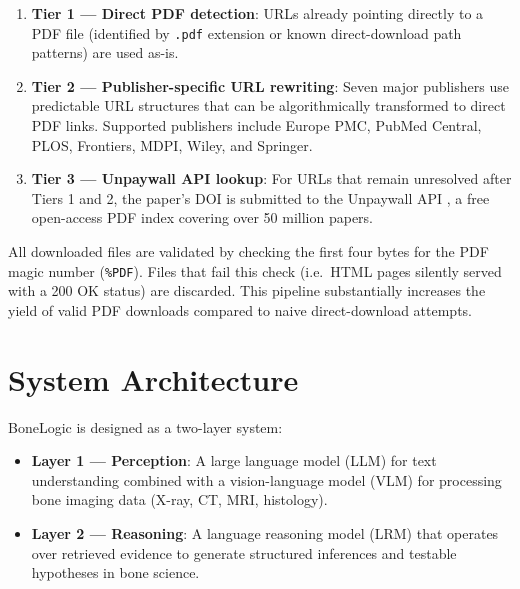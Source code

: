 \documentclass[12pt, a4paper]{article}
\begin{document}
\begin{enumerate}
    \item \textbf{Tier 1 --- Direct PDF detection}: URLs already pointing directly
          to a PDF file (identified by \texttt{.pdf} extension or known
          direct-download path patterns) are used as-is.
    \item \textbf{Tier 2 --- Publisher-specific URL rewriting}: Seven major
          publishers use predictable URL structures that can be algorithmically
          transformed to direct PDF links. Supported publishers include
          Europe PMC, PubMed Central, PLOS, Frontiers, MDPI, Wiley, and Springer.
    \item \textbf{Tier 3 --- Unpaywall API lookup}: For URLs that remain
          unresolved after Tiers 1 and 2, the paper's DOI is submitted to
          the Unpaywall API \cite{unpaywall}, a free open-access PDF index
          covering over 50 million papers.
\end{enumerate}

All downloaded files are validated by checking the first four bytes for the
PDF magic number (\texttt{\%PDF}). Files that fail this check (i.e.\ HTML
pages silently served with a 200 OK status) are discarded.
This pipeline substantially increases the yield of valid PDF downloads
compared to naive direct-download attempts.

\section{System Architecture}
\label{sec:architecture}


BoneLogic is designed as a two-layer system:

\begin{itemize}
    \item \textbf{Layer 1 — Perception}: A large language model (LLM) for
          text understanding combined with a vision-language model (VLM)
          for processing bone imaging data (X-ray, CT, MRI, histology).
    \item \textbf{Layer 2 — Reasoning}: A language reasoning model (LRM)
          that operates over retrieved evidence to generate structured
          inferences and testable hypotheses in bone science.
\end{itemize}
\end{document}
